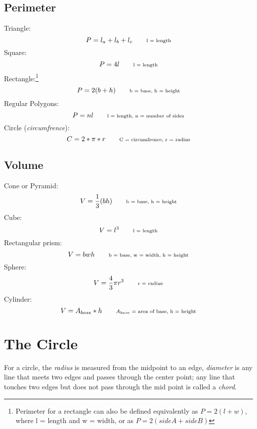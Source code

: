    \subsection{Perimeter}\label{perimeter}
Triangle:
\begin{equation}
    P = l_a + l_b + l_c \qquad \text{\scriptsize l = length}
\end{equation}
Square:
\begin{equation}
    P = 4l \qquad \text{\scriptsize l = length}
\end{equation}
Rectangle:\footnote{Perimeter for a rectangle can also be defined equivalently as $P = 2(l + w)$, where l = length and w = width, or as $P = 2(side A + side B)$}
\begin{equation}
    P = 2(b + h) \qquad \text{\scriptsize b = base, h = height}
\end{equation}
Regular Polygons:
\begin{equation}
    P = nl \qquad \text{\scriptsize l = length, n = number of sides}
\end{equation}
Circle (\textsl{circumfrence}):
\begin{equation}
    C = 2 * \pi * r \qquad \text{\scriptsize C = circumfrence, r = radius}
\end{equation}

   \subsection{Volume}
Cone or Pyramid:
\begin{equation}
    V = \frac{1}{3}(bh) \qquad \text{\scriptsize b = base, h = height}
\end{equation}
Cube:
\begin{equation}
    V = l^3 \qquad \text{\scriptsize l = length}
\end{equation}
Rectangular prism:
\begin{equation}
    V = bwh \qquad \text{\scriptsize b = base, w = width, h = height}
\end{equation}
Sphere:
\begin{equation}
    V = \frac{4}{3}\pi r^3 \qquad \text{\scriptsize r = radius}
\end{equation}
Cylinder:
\begin{equation}
    V = A_{base} * h \qquad \text{\scriptsize $A_{base}$ = area of base, h = height}
\end{equation}

      \section{The Circle}
For a circle, the \textsl{radius} is measured from the midpoint to an edge, \textsl{diameter} is any line that meets two edges and passes through the center point; any line that touches two edges but does not pass through the mid point is called a \textsl{chord}.

